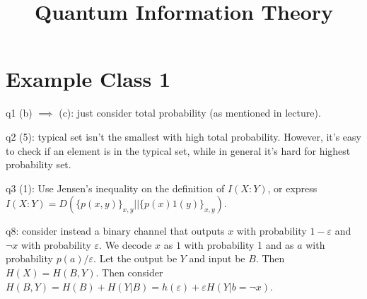 \documentclass[a4paper]{article}
\begin{document}
\title{Quantum Information Theory}

\maketitle

\newpage

\tableofcontents

\newpage

\section{Example Class 1}

q1 (b) $\implies$ (c): just consider total probability (as mentioned in lecture).

q2 (5): typical set isn't the smallest with high total probability. However, it's easy to check if an element is in the typical set, while in general it's hard for highest probability set.

q3 (1): Use Jensen's inequality on the definition of $I(X:Y)$, or express $I(X:Y) = D(\{p(x,y)\}_{x,y} || \{p(x)1(y)\}_{x,y})$.

q8: consider instead a binary channel that outputs $x$ with probability $1-\varepsilon$ and $\neg x$ with probability $\varepsilon$. We decode $x$ as $1$ with probability 1 and as $a$ with probability $p(a)/\varepsilon$. Let the output be $Y$ and input be $B$. Then $H(X) = H(B,Y)$. Then consider $H(B,Y) = H(B) + H(Y|B) = h(\varepsilon) + \varepsilon H(Y|b=\neg x)$.
\end{document}
